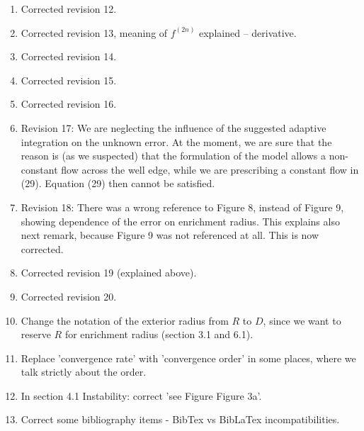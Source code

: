 \documentclass[a4paper,11pt]{article}
\begin{document}
\begin{enumerate}
\item Corrected revision 12. %
\item Corrected revision 13, meaning of $f^{(2n)}$ explained -- derivative. %
\item Corrected revision 14. %
\item Corrected revision 15. %
\item Corrected revision 16. %

\item Revision 17: We are neglecting the influence of the suggested adaptive integration on the unknown error. 
      At the moment, we are sure that the reason is (as we suspected) that the formulation of the model allows a non-constant
      flow across the well edge, while we are prescribing a constant flow in (29). Equation (29) then cannot be satisfied. %

\item Revision 18: There was a wrong reference to Figure 8, instead of Figure 9, showing dependence of the error on enrichment radius. %
      This explains also next remark, because Figure 9 was not referenced at all.
      This is now corrected. %
\item Corrected revision 19 (explained above). %
\item Corrected revision 20. %

\item Change the notation of the exterior radius from $R$ to $D$, since we want to reserve $R$ for enrichment radius (section 3.1 and 6.1).
\item Replace 'convergence rate' with 'convergence order' in some places, where we talk strictly about the order.
\item In section 4.1 Instability: correct 'see Figure Figure 3a'.
\item Correct some bibliography items - BibTex vs BibLaTex incompatibilities.

\end{enumerate} 
\end{document}
